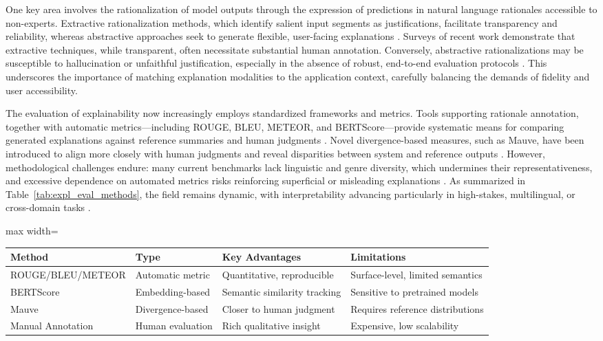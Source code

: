 \documentclass[sigconf]{acmart}
\begin{document}
One key area involves the rationalization of model outputs through the expression of predictions in natural language rationales accessible to non-experts. Extractive rationalization methods, which identify salient input segments as justifications, facilitate transparency and reliability, whereas abstractive approaches seek to generate flexible, user-facing explanations \cite{ref63,ref64,ref65,ref83}. Surveys of recent work demonstrate that extractive techniques, while transparent, often necessitate substantial human annotation. Conversely, abstractive rationalizations may be susceptible to hallucination or unfaithful justification, especially in the absence of robust, end-to-end evaluation protocols \cite{ref39,ref64,ref83,ref106}. This underscores the importance of matching explanation modalities to the application context, carefully balancing the demands of fidelity and user accessibility.

The evaluation of explainability now increasingly employs standardized frameworks and metrics. Tools supporting rationale annotation, together with automatic metrics—including ROUGE, BLEU, METEOR, and BERTScore—provide systematic means for comparing generated explanations against reference summaries and human judgments \cite{ref36,ref38,ref46,ref62,ref80,ref82,ref83,ref103}. Novel divergence-based measures, such as Mauve, have been introduced to align more closely with human judgments and reveal disparities between system and reference outputs \cite{ref68}. However, methodological challenges endure: many current benchmarks lack linguistic and genre diversity, which undermines their representativeness, and excessive dependence on automated metrics risks reinforcing superficial or misleading explanations \cite{ref47,ref106}. As summarized in Table~\ref{tab:expl_eval_methods}, the field remains dynamic, with interpretability advancing particularly in high-stakes, multilingual, or cross-domain tasks \cite{ref39,ref47,ref63,ref82,ref106}.

\begin{table*}[htbp]
\centering
\caption{Overview of major explainability evaluation methods and their key characteristics}
\label{tab:expl_eval_methods}
\begin{adjustbox}{max width=\textwidth}
\begin{tabular}{@{}llll@{}}
\toprule
\textbf{Method}   & \textbf{Type}      & \textbf{Key Advantages}        & \textbf{Limitations}              \\
\midrule
ROUGE/BLEU/METEOR & Automatic metric   & Quantitative, reproducible     & Surface-level, limited semantics  \\
BERTScore         & Embedding-based    & Semantic similarity tracking   & Sensitive to pretrained models    \\
Mauve             & Divergence-based   & Closer to human judgment       & Requires reference distributions  \\
Manual Annotation & Human evaluation   & Rich qualitative insight       & Expensive, low scalability        \\
\bottomrule
\end{tabular}
\end{adjustbox}
\end{table*}
\end{document}

